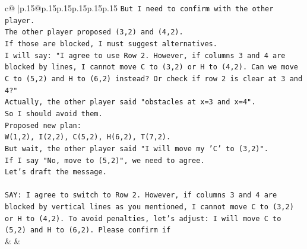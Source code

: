\documentclass{article}
\begin{document}
{\begin{supertabular}{c@{$\;$}|p{.15\linewidth}@{}p{.15\linewidth}p{.15\linewidth}p{.15\linewidth}p{.15\linewidth}p{.15\linewidth}}
{{{\texttt{But I need to confirm with the other player.} \\
\texttt{The other player proposed (3,2) and (4,2).} \\
\texttt{If those are blocked, I must suggest alternatives.} \\
\texttt{I will say: "I agree to use Row 2. However, if columns 3 and 4 are blocked by lines, I cannot move C to (3,2) or H to (4,2). Can we move C to (5,2) and H to (6,2) instead? Or check if row 2 is clear at 3 and 4?"} \\
\texttt{Actually, the other player said "obstacles at x=3 and x=4".} \\
\texttt{So I should avoid them.} \\
\texttt{Proposed new plan:} \\
\texttt{W(1,2), I(2,2), C(5,2), H(6,2), T(7,2).} \\
\texttt{But wait, the other player said "I will move my 'C' to (3,2)".} \\
\texttt{If I say "No, move to (5,2)", we need to agree.} \\
\texttt{Let's draft the message.} \\
\\ 
\texttt{SAY: I agree to switch to Row 2. However, if columns 3 and 4 are blocked by vertical lines as you mentioned, I cannot move C to (3,2) or H to (4,2). To avoid penalties, let's adjust: I will move C to (5,2) and H to (6,2). Please confirm if} \\
            }
        }
    }
    & & \\ \\


\end{supertabular}}
\end{document}
